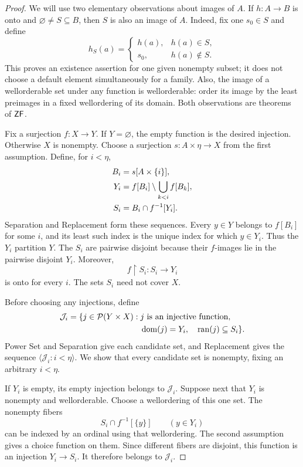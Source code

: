 \begin{proof}
We will use two elementary observations about images of $A$.
If $h:A\longrightarrow B$ is onto and $\varnothing\ne S\subseteq B$,
then $S$ is also an image of $A$.  Indeed, fix one $s_0\in S$ and
define
\[
 h_S(a)=
 \begin{cases}
 h(a),&h(a)\in S,\\
 s_0,&h(a)\notin S.
 \end{cases}
\]
This proves an existence assertion for one given nonempty subset;
it does not choose a default element simultaneously for a family.
Also, the image of a wellorderable set under any function is
wellorderable: order its image by the least preimages in a fixed
wellordering of its domain.  Both observations are theorems of $\mathsf{ZF}$.

Fix a surjection $f:X\longrightarrow Y$.  If $Y=\varnothing$, the
empty function is the desired injection.  Otherwise $X$ is nonempty.
Choose a surjection $s:A\times\eta\longrightarrow X$ from the first
assumption.  Define, for $i<\eta$,
\begin{align}
 B_i&=s[A\times\{i\}],\notag\\
 Y_i&=f[B_i]\setminus\bigcup_{k<i}f[B_k],\notag\\
 S_i&=B_i\cap f^{-1}[Y_i].\label{eq:final-disjoint-slices}
\end{align}
Separation and Replacement form these sequences.  Every $y\in Y$
belongs to $f[B_i]$ for some $i$, and its least such index is the
unique index for which $y\in Y_i$.  Thus the $Y_i$ partition $Y$.
The $S_i$ are pairwise disjoint because their $f$-images lie in the
pairwise disjoint $Y_i$.  Moreover,
\[
 f\mathbin{\upharpoonright}S_i:S_i\longrightarrow Y_i
\]
is onto for every $i$.  The sets $S_i$ need not cover $X$.

Before choosing any injections, define
\begin{equation}\label{eq:final-candidate-injections}
 \begin{split}
 \mathcal J_i=\{j\in\mathcal P(Y\times X):{}&
    j\text{ is an injective function},\\
    &\operatorname{dom}(j)=Y_i,\quad\operatorname{ran}(j)\subseteq S_i\}.
 \end{split}
\end{equation}
Power Set and Separation give each candidate set, and Replacement
gives the sequence $\langle\mathcal J_i:i<\eta\rangle$.
We show that every candidate set is nonempty, fixing an arbitrary
$i<\eta$.

If $Y_i$ is empty, its empty injection belongs to $\mathcal J_i$.
Suppose next that $Y_i$ is nonempty and wellorderable.  Choose a
wellordering of this one set.  The nonempty fibers
\[
 S_i\cap f^{-1}[\{y\}]\qquad(y\in Y_i)
\]
can be indexed by an ordinal using that wellordering.  The second
assumption gives a choice function on them.  Since different fibers
are disjoint, this function is an injection $Y_i\longrightarrow S_i$.
It therefore belongs to $\mathcal J_i$.


\end{proof}

